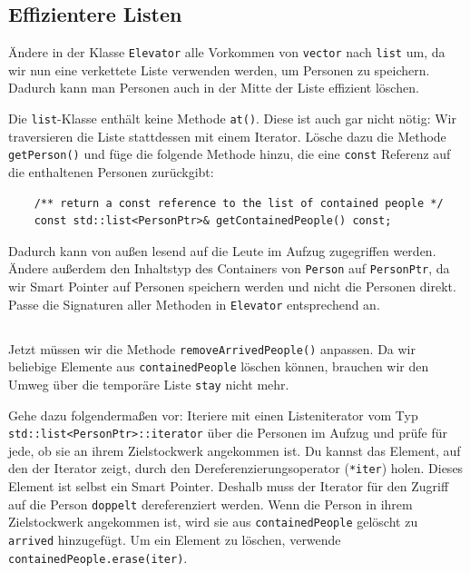 \subsection{Effizientere Listen}
Ändere in der Klasse \texttt{Elevator} alle Vorkommen von \texttt{vector} nach \texttt{list} um, da wir nun eine verkettete Liste verwenden werden, um Personen zu speichern.
Dadurch kann man Personen auch in der Mitte der Liste effizient löschen.

Die \texttt{list}-Klasse enthält keine Methode \texttt{at()}.
Diese ist auch gar nicht nötig:
Wir traversieren die Liste stattdessen mit einem Iterator.
Lösche dazu die Methode \texttt{getPerson()} und füge die folgende Methode hinzu, die eine \texttt{const} Referenz auf die enthaltenen Personen zurückgibt:

\begin{lstlisting}
	/** return a const reference to the list of contained people */
	const std::list<PersonPtr>& getContainedPeople() const;
\end{lstlisting}

Dadurch kann von außen lesend auf die Leute im Aufzug zugegriffen werden.
Ändere außerdem den Inhaltstyp des Containers von \texttt{Person} auf \texttt{PersonPtr}, da wir Smart Pointer auf Personen speichern werden und nicht die Personen direkt.
Passe die Signaturen aller Methoden in \texttt{Elevator} entsprechend an.

\subsection{}
Jetzt müssen wir die Methode \texttt{removeArrivedPeople()} anpassen.
Da wir beliebige Elemente aus \texttt{containedPeople} löschen können, brauchen wir den Umweg über die temporäre Liste \texttt{stay} nicht mehr.

Gehe dazu folgendermaßen vor:
Iteriere mit einen Listeniterator vom Typ \texttt{std::list<PersonPtr>::iterator} über die Personen im Aufzug und prüfe für jede, ob sie an ihrem Zielstockwerk angekommen ist.
Du kannst das Element, auf den der Iterator zeigt, durch den Dereferenzierungsoperator (\texttt{*iter}) holen.
Dieses Element ist selbst ein Smart Pointer.
Deshalb muss der Iterator für den Zugriff auf die Person \texttt{doppelt} dereferenziert werden.
Wenn die Person in ihrem Zielstockwerk angekommen ist, wird sie aus \texttt{containedPeople} gelöscht zu \texttt{arrived} hinzugefügt.
Um ein Element zu löschen, verwende \texttt{containedPeople.erase(iter)}.

